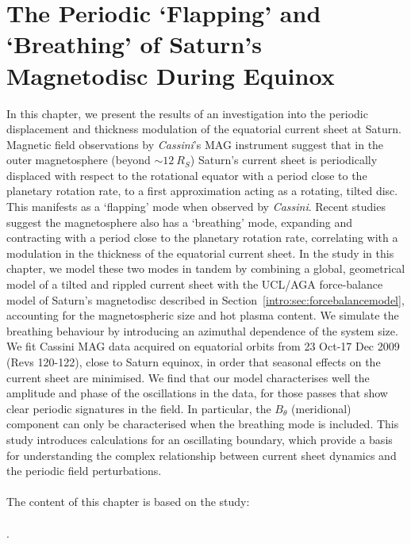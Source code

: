 \chapter[The Periodic Flapping and Breathing of Saturn's Magnetodisc]{The Periodic `Flapping' and `Breathing' of Saturn's Magnetodisc During Equinox}
\label{chap:equinox}
In this chapter, we present the results of an investigation into the periodic displacement and thickness modulation of the equatorial current sheet at Saturn. Magnetic field observations by \textit{Cassini}'s MAG instrument suggest that in the outer magnetosphere (beyond ${\sim}\SI{12}{R_S}$) Saturn's current sheet is periodically displaced with respect to the rotational equator with a period close to  the planetary rotation rate, to a first approximation acting as a rotating, tilted disc. This manifests as a `flapping' mode when observed by \textit{Cassini}. Recent studies suggest the magnetosphere also has a `breathing' mode, expanding and contracting with a period close to the planetary rotation rate, correlating with a modulation in the thickness of the equatorial current sheet. In the study in this chapter, we model these two modes in tandem by combining a global, geometrical model of a tilted and rippled current sheet with the UCL/AGA force-balance model of Saturn's magnetodisc described in Section~\ref{intro:sec:forcebalancemodel}, accounting for the magnetospheric size and hot plasma content. We simulate the breathing behaviour by introducing an azimuthal dependence of the system size. We fit Cassini MAG data acquired on equatorial orbits from 23 Oct{\--}17 Dec 2009 (Revs 120{\--}122), close to Saturn equinox, in order that seasonal effects on the current sheet are minimised. We find that our model characterises well the amplitude and phase of the oscillations in the data, for those passes that show clear periodic signatures in the field. In particular, the $B_\theta$ (meridional) component can only be characterised when the breathing mode is included. This study introduces calculations for an oscillating boundary, which provide a basis for understanding the complex relationship between current sheet dynamics and the periodic field perturbations. \\
\\
The content of this chapter is based on the study:\\
\\
.

